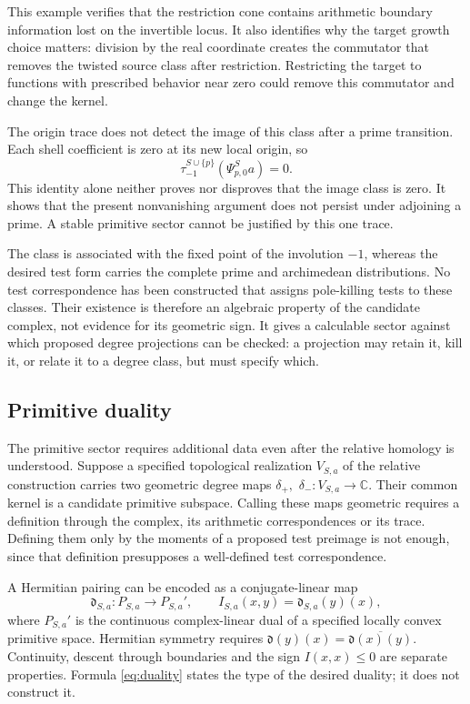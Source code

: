 \documentclass[11pt,letterpaper]{article}
\theoremstyle{definition}
\theoremstyle{remark}
\newcommand{\C}{\mathbb C}
\begin{document}
This example verifies that the restriction cone contains
arithmetic boundary information lost on the invertible locus.
It also identifies why the target growth choice matters:
division by the real coordinate creates the commutator that
removes the twisted source class after restriction. Restricting
the target to functions with prescribed behavior near zero
could remove this commutator and change the kernel.

The origin trace does not detect the image of this class after
a prime transition. Each shell coefficient is zero at its
new local origin, so
\begin{equation}
 \tau_{-1}^{S\cup\{p\}}(\Psi_{p,0}^Sa)=0.
 \label{eq:trace-shell-zero}
\end{equation}
This identity alone neither proves nor disproves that the
image class is zero. It shows that the present nonvanishing
argument does not persist under adjoining a prime. A stable
primitive sector cannot be justified by this one trace.

The class is associated with the fixed point of the involution
$-1$, whereas the desired test form carries the complete prime
and archimedean distributions. No test correspondence has been
constructed that assigns pole-killing tests to these classes.
Their existence is therefore an algebraic property of the
candidate complex, not evidence for its geometric sign.
It gives a calculable sector against which proposed degree
projections can be checked: a projection may retain it, kill
it, or relate it to a degree class, but must specify which.

\subsection{Primitive duality}

The primitive sector requires additional data even after the
relative homology is understood. Suppose a specified topological
realization $V_{S,a}$ of the relative construction carries two
geometric degree maps $\delta_+,$ $\delta_-:V_{S,a}\to\C$.
Their common kernel is a candidate primitive subspace. Calling
these maps geometric requires a definition through the complex,
its arithmetic correspondences or its trace. Defining them only
by the moments of a proposed test preimage is not enough, since
that definition presupposes a well-defined test correspondence.

A Hermitian pairing can be encoded as a conjugate-linear map
\begin{equation}
 \mathfrak d_{S,a}:P_{S,a}\longrightarrow P_{S,a}',\qquad
 I_{S,a}(x,y)=\mathfrak d_{S,a}(y)(x),
 \label{eq:duality}
\end{equation}
where $P_{S,a}'$ is the continuous complex-linear dual of a specified
locally convex primitive space. Hermitian symmetry requires
$\mathfrak d(y)(x)=\overline{\mathfrak d(x)(y)}$. Continuity,
descent through boundaries and the sign $I(x,x)\le0$ are separate
properties. Formula \eqref{eq:duality} states the type of the desired
duality; it does not construct it.
\end{document}
